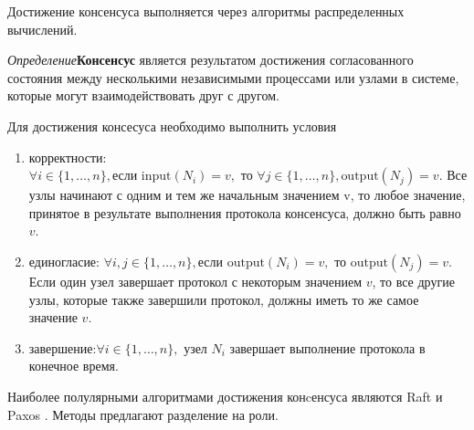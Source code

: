\cite{stich2019unified}

\cite{szlendak2021permutation}

Достижение консенсуса выполняется через алгоритмы распределенных вычислений. 

\textit{Определение}\textbf{Консенсус} является результатом достижения согласованного состояния между несколькими независимыми 
процессами или узлами в системе, которые могут взаимодействовать друг с другом. 

Для достижения консесуса необходимо выполнить условия \begin{enumerate}
    \item корректности: $\forall i \in \{1, \ldots, n\}, \text{если } \text{input}(N_i) = v, \text{ то } \forall j \in \{1, \ldots, n\}, \text{output}(N_j) = v$.
     Все узлы начинают с одним и тем же начальным значением v, то любое значение, принятое в результате выполнения протокола консенсуса, должно быть равно \( v \).
    \item единогласие: $\forall i, j \in \{1, \ldots, n\}, \text{если } \text{output}(N_i) = v, \text{ то } \text{output}(N_j) = v$.
     Если один узел завершает протокол с некоторым значением \( v \), то все другие узлы, которые также завершили протокол, должны иметь то же самое значение \( v \).
    \item завершение:$\forall i \in \{1, \ldots, n\}, \text{ узел } N_i$ 
    завершает выполнение протокола в конечное время.
\end{enumerate}

Наиболее полулярными алгоритмами достижения конcенсуса являются Raft \cite{lamport2019time} и Paxos \cite{pease1980reaching}. Методы
предлагают разделение на роли.


